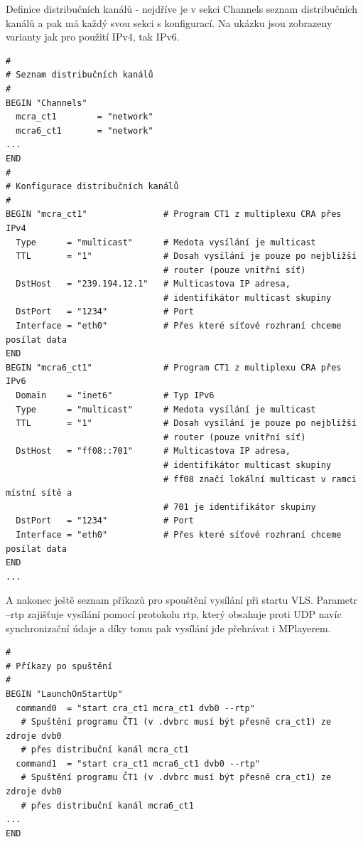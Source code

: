 \vspace{10pt}

Definice distribučních kanálů - nejdříve je v sekci Channels seznam distribučních kanálů a pak má každý svou sekci s konfigurací. Na ukázku jsou zobrazeny varianty jak pro použití IPv4, tak IPv6.

\vspace{10pt}

\begin{small}
\begin{verbatim}
#
# Seznam distribučních kanálů
#
BEGIN "Channels"
  mcra_ct1        = "network"
  mcra6_ct1       = "network"
...
END
#
# Konfigurace distribučních kanálů
#
BEGIN "mcra_ct1"               # Program CT1 z multiplexu CRA přes IPv4
  Type      = "multicast"      # Medota vysílání je multicast
  TTL       = "1"              # Dosah vysílání je pouze po nejbližší 
                               # router (pouze vnitřní síť)
  DstHost   = "239.194.12.1"   # Multicastova IP adresa, 
                               # identifikátor multicast skupiny
  DstPort   = "1234"           # Port
  Interface = "eth0"           # Přes které síťové rozhraní chceme posílat data
END
BEGIN "mcra6_ct1"              # Program CT1 z multiplexu CRA přes IPv6
  Domain    = "inet6"          # Typ IPv6
  Type      = "multicast"      # Medota vysílání je multicast
  TTL       = "1"              # Dosah vysílání je pouze po nejbližší 
                               # router (pouze vnitřní síť)
  DstHost   = "ff08::701"      # Multicastova IP adresa, 
                               # identifikátor multicast skupiny
                               # ff08 značí lokální multicast v ramci místní sítě a 
                               # 701 je identifikátor skupiny
  DstPort   = "1234"           # Port
  Interface = "eth0"           # Přes které síťové rozhraní chceme posílat data
END
...

\end{verbatim}
\end{small}

\vspace{10pt}

A nakonec ještě seznam příkazů pro spouštění vysílání při startu VLS. Parametr --rtp zajišťuje vysílání pomocí protokolu rtp, který obsahuje proti UDP navíc synchronizační údaje a díky tomu pak vysílání jde přehrávat i MPlayerem.

\vspace{10pt}

\begin{small}
\begin{verbatim}
#
# Příkazy po spuštění
#
BEGIN "LaunchOnStartUp"
  command0  = "start cra_ct1 mcra_ct1 dvb0 --rtp"
   # Spuštění programu ČT1 (v .dvbrc musí být přesně cra_ct1) ze zdroje dvb0 
   # přes distribuční kanál mcra_ct1
  command1  = "start cra_ct1 mcra6_ct1 dvb0 --rtp"   
   # Spuštění programu ČT1 (v .dvbrc musí být přesně cra_ct1) ze zdroje dvb0 
   # přes distribuční kanál mcra6_ct1
...
END

\end{verbatim}
\end{small}

